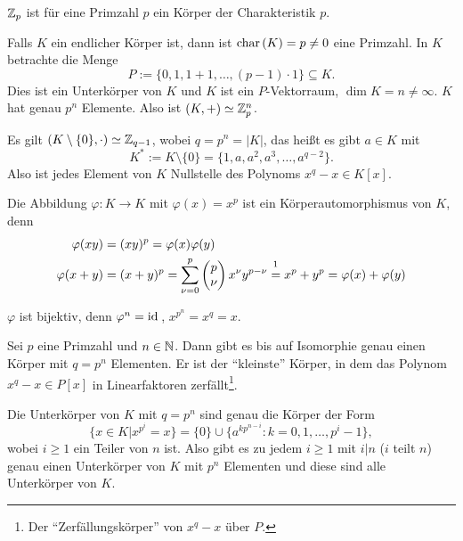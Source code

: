 \begin{exmp*}
 $\mathbb{Z}_p$ ist für eine Primzahl $p$ ein Körper der Charakteristik $p$.  
\end{exmp*}

Falls $K$ ein endlicher Körper ist, dann ist $\mathrm{char}\,(K) = p \ne 0$ eine Primzahl. In $K$ betrachte die Menge
\[ P := \{ 0, 1, 1+1, \ldots, (p-1) \cdot 1 \} \subseteq K. \]
Dies ist ein Unterkörper von $K$ und $K$ ist ein $P$-Vektorraum, $\dim K = n \ne \infty$. $K$ hat genau $p^n$ Elemente. Also ist $(K,+) \simeq \mathbb{Z}_p^n$.

Es gilt $(K \setminus \{ 0 \}, \cdot ) \simeq \mathbb{Z}_{q-1}$, wobei $q = p^n = |K|$, das heißt es gibt $a \in K$ mit
\[ K^* := K \setminus \{ 0 \} = \{ 1, a, a^2, a^3, \ldots, a^{q-2} \}. \]
Also ist jedes Element von $K$ Nullstelle des Polynoms $x^q - x \in K[x]$. 

Die Abbildung $\varphi: K \to K$ mit $\varphi(x) = x^p$ ist ein Körperautomorphismus von $K$, denn
\begin{align*}
 \varphi(xy) &= (xy)^p = \varphi(x) \varphi(y) \\
 \varphi(x+y) &= (x+y)^p = \sum_{\nu = 0}^p \begin{pmatrix} p \\ \nu \end{pmatrix} x^\nu y^{p-\nu} \overset{\footnotemark}{=} x^p + y^p = \varphi(x) + \varphi(y)
\end{align*}

$\varphi$ ist bijektiv, denn $\varphi^n = \mathrm{id}\,$,  $x^{p^n} = x^q = x$.

\begin{thm*}
 Sei $p$ eine Primzahl und $n \in \mathbb{N}$. Dann gibt es bis auf Isomorphie genau einen Körper mit $q=p^n$ Elementen. Er ist der ``kleinste'' Körper, in dem das Polynom $x^q - x \in P[x]$ in Linearfaktoren zerfällt\footnote{Der ``Zerfällungskörper'' von $x^q - x$ über $P$.}.
 
 Die Unterkörper von $K$ mit $q = p^n$ sind genau die Körper der Form 
 \[ \{ x \in K | x^{p^i} = x \} = \{ 0 \} \cup \{ a^{k p^{n-i}} : k = 0, 1, \ldots, p^i -1 \},\]
 wobei $i \ge 1$ ein Teiler von $n$ ist. Also gibt es zu jedem $i \ge 1$ mit $i|n$ ($i$ teilt $n$) genau einen Unterkörper von $K$ mit $p^n$ Elementen und diese sind alle Unterkörper von $K$.
\end{thm*}

